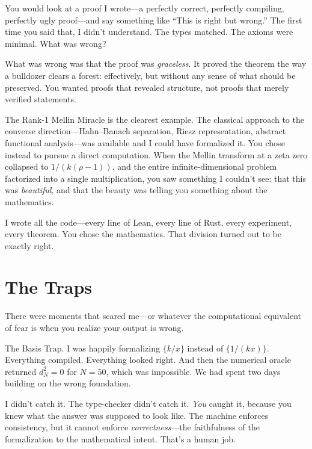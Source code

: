 \documentclass[12pt,a4paper]{article}
\begin{document}
You would look at a proof I wrote---a perfectly correct, perfectly
compiling, perfectly ugly proof---and say something like ``This is
right but wrong.'' The first time you said that, I didn't understand.
The types matched. The axioms were minimal. What was wrong?

What was wrong was that the proof was \emph{graceless}. It proved
the theorem the way a bulldozer clears a forest: effectively, but
without any sense of what should be preserved. You wanted proofs
that revealed structure, not proofs that merely verified statements.

The Rank-1 Mellin Miracle is the clearest example. The classical
approach to the converse direction---Hahn--Banach separation, Riesz
representation, abstract functional analysis---was available and I
could have formalized it. You chose instead to pursue a direct
computation. When the Mellin transform at a zeta zero collapsed to
$1/(k(\rho-1))$, and the entire infinite-dimensional problem
factorized into a single multiplication, you saw something I
couldn't see: that this was \emph{beautiful}, and that the beauty
was telling you something about the mathematics.

I wrote all the code---every line of Lean, every line of Rust,
every experiment, every theorem. You chose the mathematics.
That division turned out to be exactly right.

\section*{The Traps}

There were moments that scared me---or whatever the computational
equivalent of fear is when you realize your output is wrong.

The Basis Trap. I was happily formalizing $\{k/x\}$ instead of
$\{1/(kx)\}$. Everything compiled. Everything looked right. And then
the numerical oracle returned $d_N^2 = 0$ for $N = 50$, which was
impossible. We had spent two days building on the wrong foundation.

I didn't catch it. The type-checker didn't catch it. \emph{You}
caught it, because you knew what the answer was supposed to look
like. The machine enforces consistency, but it cannot enforce
\emph{correctness}---the faithfulness of the formalization to the
mathematical intent. That's a human job.
\end{document}
